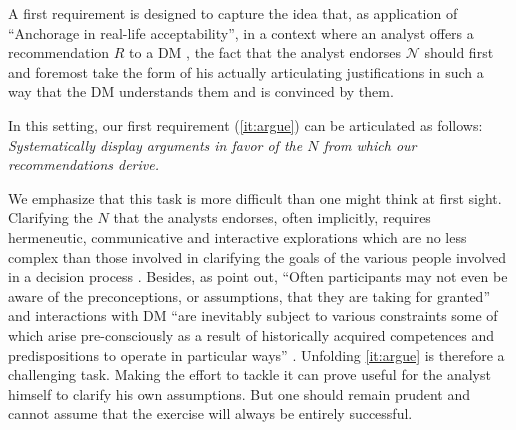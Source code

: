 \documentclass[preprint, french, english, 11pt, authoryear]{elsarticle}%
\newcommand{\adv}{\mathscr{N}}
\begin{document}
A first requirement is designed to capture the idea that, as application of “Anchorage in real-life acceptability”, in a context where an analyst offers a recommendation $R$ to a DM%
, 
the fact that the analyst endorses $\adv$ should first and foremost take the form of his actually articulating justifications in such a way that the DM%
 understands them and is convinced by them.


In this setting, our first requirement (\cref{it:argue}) can be articulated as follows: \emph{Systematically display arguments in favor of the $N$ from which our recommendations derive.}

We emphasize that this task is more difficult than one might think at first sight.
Clarifying the $N$ that the analysts endorses, often implicitly, requires hermeneutic, communicative and interactive explorations which are no less complex than those involved in clarifying the goals of the various people involved in a decision process \citep{reisach_creation_2016}.
Besides, as \citet{cronin_issues_2014} point out, ``Often participants may not even be aware of the preconceptions, or assumptions, that they are taking for granted'' and interactions with DM%
``are inevitably subject to various constraints some of which arise pre-consciously as a result of historically acquired competences and predispositions to operate in particular ways'' \citep{brocklesby_ethics_2009}.
Unfolding \cref{it:argue} is therefore a challenging task. Making the effort to tackle it can prove useful for the analyst himself to clarify his own assumptions. But one should remain prudent and cannot assume that the exercise will always be entirely successful.
\end{document}
